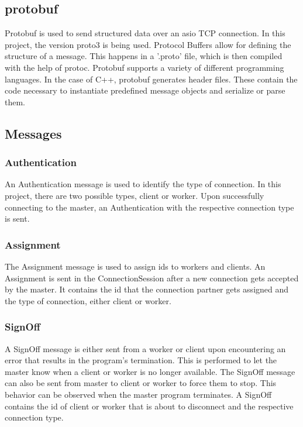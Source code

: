 \documentclass[12pt, letterpaper]{article}
\begin{document}
\subsection{protobuf}

Protobuf is used to send structured data over an asio TCP connection. In this project, the version proto3 is being used. Protocol Buffers allow for defining the structure of a message. This happens in a '.proto' file, which is then compiled with the help of protoc. Protobuf supports a variety of different programming languages. In the case of C++, protobuf generates header files. These contain the code necessary to instantiate predefined message objects and serialize or parse them.  

\subsection{Messages}

\subsubsection{Authentication}
An Authentication message is used to identify the type of connection. In this project, there are two possible types, client or worker. Upon successfully connecting to the master, an Authentication with the respective connection type is sent. 

\subsubsection{Assignment}
The Assignment message is used to assign ids to workers and clients. An Assignment is sent in the ConnectionSession after a new connection gets accepted by the master. It contains the id that the connection partner gets assigned and the type of connection, either client or worker.

\subsubsection{SignOff}
A SignOff message is either sent from a worker or client upon encountering an error that results in the program's termination. This is performed to let the master know when a client or worker is no longer available. The SignOff message can also be sent from master to client or worker to force them to stop. This behavior can be observed when the master program terminates. A SignOff contains the id of client or worker that is about to disconnect and the respective connection type.
\end{document}
